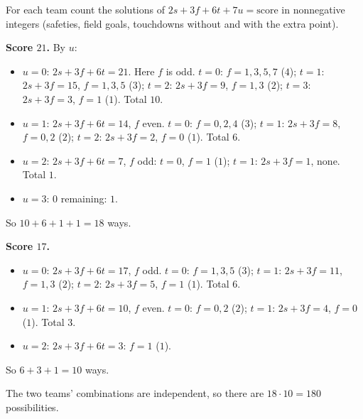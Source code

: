 For each team count the solutions of $2s+3f+6t+7u=\text{score}$ in nonnegative integers (safeties, field goals, touchdowns without and with the extra point).

\textbf{Score $21$.} By $u$:
\begin{itemize}
\item $u=0$: $2s+3f+6t=21$. Here $f$ is odd. $t=0$: $f=1,3,5,7$ ($4$); $t=1$: $2s+3f=15$, $f=1,3,5$ ($3$); $t=2$: $2s+3f=9$, $f=1,3$ ($2$); $t=3$: $2s+3f=3$, $f=1$ ($1$). Total $10$.
\item $u=1$: $2s+3f+6t=14$, $f$ even. $t=0$: $f=0,2,4$ ($3$); $t=1$: $2s+3f=8$, $f=0,2$ ($2$); $t=2$: $2s+3f=2$, $f=0$ ($1$). Total $6$.
\item $u=2$: $2s+3f+6t=7$, $f$ odd: $t=0$, $f=1$ ($1$); $t=1$: $2s+3f=1$, none. Total $1$.
\item $u=3$: $0$ remaining: $1$.
\end{itemize}
So $10+6+1+1=18$ ways.

\textbf{Score $17$.}
\begin{itemize}
\item $u=0$: $2s+3f+6t=17$, $f$ odd. $t=0$: $f=1,3,5$ ($3$); $t=1$: $2s+3f=11$, $f=1,3$ ($2$); $t=2$: $2s+3f=5$, $f=1$ ($1$). Total $6$.
\item $u=1$: $2s+3f+6t=10$, $f$ even. $t=0$: $f=0,2$ ($2$); $t=1$: $2s+3f=4$, $f=0$ ($1$). Total $3$.
\item $u=2$: $2s+3f+6t=3$: $f=1$ ($1$).
\end{itemize}
So $6+3+1=10$ ways.

The two teams' combinations are independent, so there are $18\cdot10=\boxed{180}$ possibilities.
